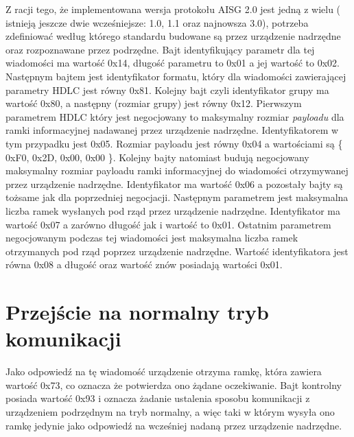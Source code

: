     Z racji tego, że implementowana wersja protokołu AISG 2.0 jest jedną z wielu ( istnieją jeszcze dwie wcześniejsze: 1.0, 1.1 oraz najnowsza 3.0),
    potrzeba zdefiniować według którego standardu budowane są przez urządzenie nadrzędne oraz rozpoznawane przez podrzędne.
	Bajt identyfikujący parametr dla tej wiadomości ma wartość 0x14, długość parametru to 0x01 a jej wartość to 0x02.
	\newline
	Następnym bajtem jest identyfikator formatu, który dla wiadomości zawierającej parametry HDLC jest równy 0x81.
	\newline
	Kolejny bajt czyli identyfikator grupy ma wartość 0x80, a następny (rozmiar grupy) jest równy 0x12.
	\newline
	Pierwszym parametrem HDLC który jest negocjowany to maksymalny rozmiar \textit{payloadu} dla ramki informacyjnej nadawanej przez urządzenie nadrzędne.
    Identyfikatorem w tym przypadku jest 0x05. Rozmiar payloadu jest równy 0x04 a wartościami są \{ 0xF0, 0x2D, 0x00, 0x00 \}.
	\newline
	Kolejny bajty natomiast budują negocjowany maksymalny rozmiar payloadu ramki informacyjnej do wiadomości otrzymywanej przez urządzenie nadrzędne.
    Identyfikator ma wartość 0x06 a pozostały bajty są tożsame jak dla poprzedniej
	negocjacji.
	\newline
	Następnym parametrem jest maksymalna liczba ramek wysłanych pod rząd przez urządzenie nadrzędne. Identyfikator ma wartość 0x07 a zarówno długość jak i wartość to 0x01.
	\newline
	Ostatnim parametrem negocjowanym podczas tej wiadomości jest maksymalna liczba ramek otrzymanych pod rząd poprzez urządzenie nadrzędne.
    Wartość identyfikatora jest równa 0x08 a długość oraz wartość znów posiadają wartości 0x01.

    \section{Przejście na normalny tryb komunikacji}
    Jako odpowiedź na tę wiadomość urządzenie otrzyma ramkę, która zawiera wartość 0x73, co oznacza że 
    potwierdza ono żądane oczekiwanie.
    \newline\newline
	Bajt kontrolny posiada wartość 0x93 i oznacza żadanie ustalenia sposobu komunikacji z urządzeniem podrzędnym na tryb normalny, 
    a więc taki w którym wysyła ono ramkę jedynie jako odpowiedź na wcześniej nadaną przez urządzenie nadrzędne.

